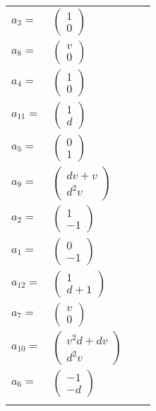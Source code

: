 \documentclass[1p]{elsarticle_modified}
\theoremstyle{definition}
\begin{document}
\begin{tabular}{m{7pt} m{180pt} m{7pt} m{180pt} }
\flushright $a_{3}=$&$\begin{pmatrix}1\\0\end{pmatrix}$ \\
\flushright $a_{8}=$&$\begin{pmatrix}v\\0\end{pmatrix}$ \\
\flushright $a_{4}=$&$\begin{pmatrix}1\\0\end{pmatrix}$ \\
\flushright $a_{11}=$&$\begin{pmatrix}1\\d\end{pmatrix}$ \\
\flushright $a_{5}=$&$\begin{pmatrix}0\\1\end{pmatrix}$ \\
\flushright $a_{9}=$&$\begin{pmatrix}d v+v\\d^2 v\end{pmatrix}$ \\
\flushright $a_{2}=$&$\begin{pmatrix}1\\-1\end{pmatrix}$ \\
\flushright $a_{1}=$&$\begin{pmatrix}0\\-1\end{pmatrix}$ \\
\flushright $a_{12}=$&$\begin{pmatrix}1\\d+1\end{pmatrix}$ \\
\flushright $a_{7}=$&$\begin{pmatrix}v\\0\end{pmatrix}$ \\
\flushright $a_{10}=$&$\begin{pmatrix}v^2 d+d v\\d^2 v\end{pmatrix}$ \\
\flushright $a_{6}=$&$\begin{pmatrix}-1\\- d\end{pmatrix}$\\&\end{tabular}
\end{document}
